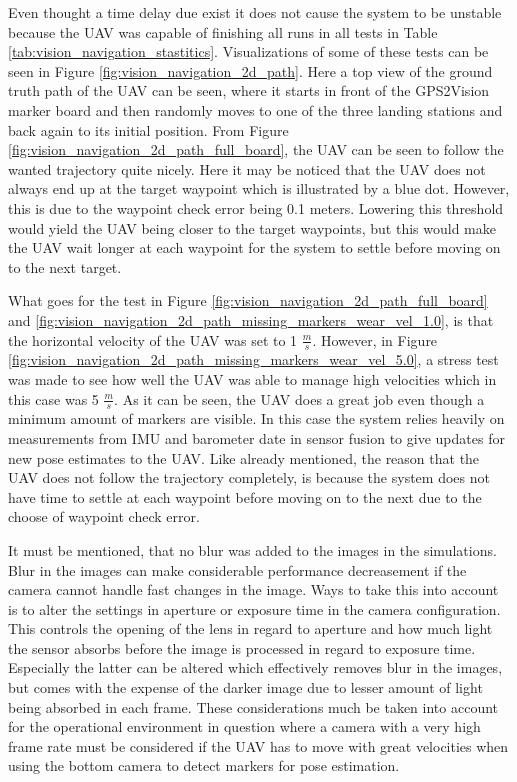 \documentclass[../Head/report.tex]{subfiles}
\begin{document}
Even thought a time delay due exist it does not cause the system to be unstable because the UAV was capable of finishing all runs in all tests in Table \ref{tab:vision_navigation_stastitics}. Visualizations of some of these tests can be seen in Figure \ref{fig:vision_navigation_2d_path}. Here a top view of the ground truth path of the UAV can be seen, where it starts in front of the GPS2Vision marker board and then randomly moves to one of the three landing stations and back again to its initial position. From Figure \ref{fig:vision_navigation_2d_path_full_board}, the UAV can be seen to follow the wanted trajectory quite nicely. Here it may be noticed that the UAV does not always end up at the target waypoint which is illustrated by a blue dot. However, this is due to the waypoint check error being 0.1 meters. Lowering this threshold would yield the UAV being closer to the target waypoints, but this would make the UAV wait longer at each waypoint for the system to settle before moving on to the next target. 

What goes for the test in Figure \ref{fig:vision_navigation_2d_path_full_board} and \ref{fig:vision_navigation_2d_path_missing_markers_wear_vel_1.0}, is that the horizontal velocity of the UAV was set to 1 $\frac{m}{s}$. However, in Figure \ref{fig:vision_navigation_2d_path_missing_markers_wear_vel_5.0}, a stress test was made to see how well the UAV was able to manage high velocities which in this case was 5 $\frac{m}{s}$. As it can be seen, the UAV does a great job even though a minimum amount of markers are visible. In this case the system relies heavily on measurements from IMU and barometer date in sensor fusion to give updates for new pose estimates to the UAV. Like already mentioned, the reason that the UAV does not follow the trajectory completely, is because the system does not have time to settle at each waypoint before moving on to the next due to the choose of waypoint check error. 

It must be mentioned, that no blur was added to the images in the simulations. Blur in the images can make considerable performance decreasement if the camera cannot handle fast changes in the image. Ways to  take this into account is to alter the settings in aperture or exposure time in the camera configuration. This controls the opening of the lens in regard to aperture and how much light the sensor absorbs before the image is processed in regard to exposure time. Especially the latter can be altered which effectively removes blur in the images, but comes with the expense of the darker image due to lesser amount of light being absorbed in each frame. These considerations much be taken into account for the operational environment in question where a camera with a very high frame rate must be considered if the UAV has to move with great velocities when using the bottom camera to detect markers for pose estimation. 
\end{document}
